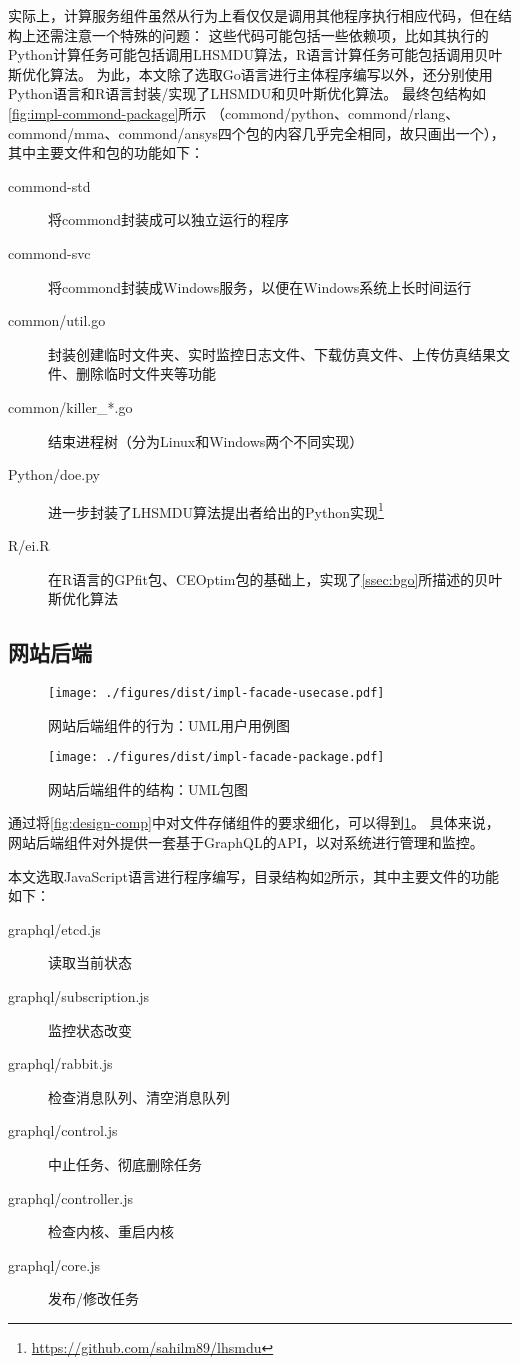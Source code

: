 \documentclass[index]{subfiles}
\begin{document}
实际上，计算服务组件虽然从行为上看仅仅是调用其他程序执行相应代码，但在结构上还需注意一个特殊的问题：
这些代码可能包括一些依赖项，比如其执行的Python计算任务可能包括调用LHSMDU算法，R语言计算任务可能包括调用贝叶斯优化算法。
为此，本文除了选取Go语言进行主体程序编写以外，还分别使用Python语言和R语言封装/实现了LHSMDU和贝叶斯优化算法。
最终包结构如\cref{fig:impl-commond-package}所示
（commond/python、commond/rlang、commond/mma、commond/ansys四个包的内容几乎完全相同，故只画出一个），
其中主要文件和包的功能如下：
\begin{description}
  \item[commond-std] 将commond封装成可以独立运行的程序
  \item[commond-svc] 将commond封装成Windows服务，以便在Windows系统上长时间运行
  \item[common/util.go] 封装创建临时文件夹、实时监控日志文件、下载仿真文件、上传仿真结果文件、删除临时文件夹等功能
  \item[common/killer\_*.go] 结束进程树（分为Linux和Windows两个不同实现）
  \item[Python/doe.py] 进一步封装了LHSMDU算法提出者给出的Python实现\footnote{\href{https://github.com/sahilm89/lhsmdu}{https://github.com/sahilm89/lhsmdu}}
  \item[R/ei.R] 在R语言的GPfit包\cite{macdonald2015}、CEOptim包\cite{benham2015}的基础上，实现了\cref{ssec:bgo}所描述的贝叶斯优化算法
\end{description}

\subsection{网站后端}
\begin{figure}[h]
  \centering
  \texttt{[image: ./figures/dist/impl-facade-usecase.pdf]}
  \caption{网站后端组件的行为：UML用户用例图\label{fig:impl-facade-usecase}}
\end{figure}
\begin{figure}[h]
  \centering
  \texttt{[image: ./figures/dist/impl-facade-package.pdf]}
  \caption{网站后端组件的结构：UML包图\label{fig:impl-facade-package}}
\end{figure}

通过将\cref{fig:design-comp}中对文件存储组件的要求细化，可以得到\cref{fig:impl-facade-usecase}。
具体来说，网站后端组件对外提供一套基于GraphQL的API，以对系统进行管理和监控。

本文选取JavaScript语言进行程序编写，目录结构如\cref{fig:impl-facade-package}所示，其中主要文件的功能如下：
\begin{description}
  \item[graphql/etcd.js] 读取当前状态
  \item[graphql/subscription.js] 监控状态改变
  \item[graphql/rabbit.js] 检查消息队列、清空消息队列
  \item[graphql/control.js] 中止任务、彻底删除任务
  \item[graphql/controller.js] 检查内核、重启内核
  \item[graphql/core.js] 发布/修改任务
\end{description}
\end{document}
